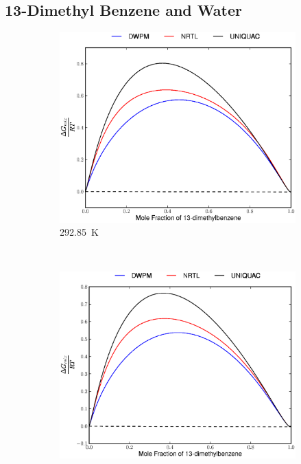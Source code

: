 \subsection{13-Dimethyl Benzene and Water}
\vspace*{\fill}
\begin{figure}[hp]
\begin{subfigure}[h]{0.5\textwidth}
	\centering
	\includegraphics[width = \textwidth]{Results_Parts/BinaryParams/13-dimethylbenzene-water/AllModelsGibbsPlots/T_292.85.eps}
	\caption{292.85~$\mathrm{K}$} 
\end{subfigure}%
~%
\begin{subfigure}[h]{0.5\textwidth}
	\centering
	\includegraphics[width = \textwidth]{Results_Parts/BinaryParams/13-dimethylbenzene-water/AllModelsGibbsPlots/T_312.85.eps}

\end{subfigure}
\end{figure}

